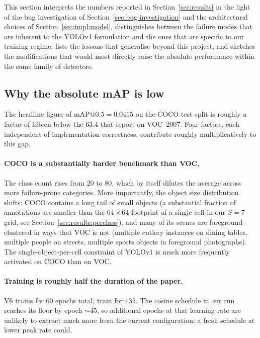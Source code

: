 
This section interprets the numbers reported in Section~\ref{sec:results} in
the light of the bug investigation of Section~\ref{sec:bug-investigation}
and the architectural choices of Section~\ref{sec:impl:model}, distinguishes
between the failure modes that are inherent to the YOLOv1 formulation and
the ones that are specific to our training regime, lists the lessons that
generalise beyond this project, and sketches the modifications that would
most directly raise the absolute performance within the same family of
detectors.

\subsection{Why the absolute mAP is low}
\label{sec:disc:why-low}

The headline figure of $\mathrm{mAP}@0.5 = 0.0415$ on the COCO test split is
roughly a factor of fifteen below the $63.4$ that
\citet{redmon2016you} report on VOC~2007. Four factors, each independent of
implementation correctness, contribute roughly multiplicatively to this gap.

\paragraph{COCO is a substantially harder benchmark than VOC.} The class
count rises from $20$ to $80$, which by itself dilutes the average across
more failure-prone categories. More importantly, the object size
distribution shifts: COCO contains a long tail of small objects (a
substantial fraction of annotations are smaller than the $64\!\times\!64$
footprint of a single cell in our $S=7$ grid, see
Section~\ref{sec:results:perclass}), and many of its scenes are
foreground-clustered in ways that VOC is not (multiple cutlery instances on
dining tables, multiple people on streets, multiple sports objects in
foreground photographs). The single-object-per-cell constraint of YOLOv1 is
much more frequently activated on COCO than on VOC.

\paragraph{Training is roughly half the duration of the paper.} V6 trains for
$60$ epochs total; \citet{redmon2016you} train for $135$. The cosine schedule
in our run reaches its floor by epoch $\sim\!45$, so additional epochs at
that learning rate are unlikely to extract much more from the current
configuration; a fresh schedule at lower peak rate could.

